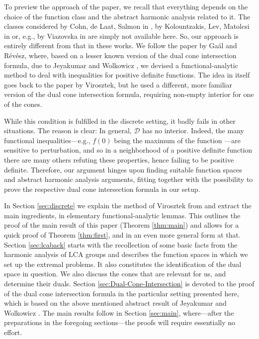 \documentclass[[a4paper,english,12pt]{amsart}
\theoremstyle{plain}
\theoremstyle{remark}
\newcommand{\DD}{{\mathcal D}}
\begin{document}
To preview the approach of the paper, we recall that everything depends on the choice of the function class and the abstract harmonic analysis related to it. The classes considered by Cohn, de Laat, Salmon in \cite{Cohn-Laat-Salmon}, by Kolountzakis, Lev, Matolcsi in \cite{KLM25} or, e.g., by Viazovska in \cite{Viazovska} are simply not available here. So, our approach is entirely different from  that in these works. We follow the paper \cite{Zeitschrift} by Ga\'al and R\'ev\'esz,  where, based on a lesser known version of the dual cone intersection formula, due to Jeyakumar and Wolkowicz \cite{JeyaWolf}, we devised a functional-analytic method to deal with inequalities for positive definite functions. The idea in itself goes back to the paper \cite{virosztek} by Virosztek, but he  used a different,  more familiar version of the dual cone intersection formula, requiring non-empty interior for one of the cones.


While this condition is fulfilled in the discrete setting, it badly fails in other situations. The reason is clear: In general, $\DD$ has no interior. Indeed, the many functional inequalities---e.g., $f(0)$ being the maximum of the function ---are sensitive to perturbation, and so in a neighborhood of a positive definite function there are many others refuting these properties, hence failing to be positive definite. Therefore, our argument hinges upon finding suitable function spaces and abstract harmonic analysis arguments, fitting together with the possibility to prove the respective dual cone intersection formula in our setup.


In Section \ref{sec:discrete} we explain the method of Virosztek from \cite{virosztek} and extract the main ingredients, in elementary functional-analytic lemmas. This outlines the  proof of the main result of this paper (Theorem \ref{thm:main}) and allows for a quick proof of Theorem \ref{thm:first}, and in an even more general form at that. Section \ref{sec:lcaback} starts with the recollection of some basic facts from the harmonic analysis of LCA groups and describes the function spaces in which we set up the extremal problems. It also  constitutes the identification of the dual space in question. We also discuss the cones that are relevant for us, and determine their duals. Section \ref{sec:Dual-Cone-Intersection} is devoted to the proof of the dual cone intersection formula in the particular setting presented here, which is based on the above mentioned abstract result of Jeyakumar and Wolkowicz \cite{JeyaWolf}. The main results follow in Section \ref{sec:main}, where---after the preparations in the foregoing sections---the proofs will require essentially no effort.
\end{document}
